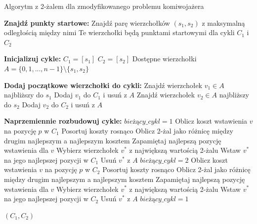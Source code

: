 \documentclass[12pt,a4paper]{article}
\begin{document}
\begin{algorithm}
\caption{Algorytm z 2-żalem dla zmodyfikowanego problemu komiwojażera}
\label{alg:regret_cycle}
\begin{algorithmic}[1]
\State \textbf{Znajdź punkty startowe:}
\State Znajdź parę wierzchołków $(s_1, s_2)$ z maksymalną odległością między nimi
\State Te wierzchołki będą punktami startowymi dla cykli $C_1$ i $C_2$

\State \textbf{Inicjalizuj cykle:}
\State $C_1 = [s_1]$
\State $C_2 = [s_2]$
\State Dostępne wierzchołki $A = \{0, 1, ..., n-1\} \setminus \{s_1, s_2\}$

\State \textbf{Dodaj początkowe wierzchołki do cykli:}
    \State Znajdź wierzchołek $v_1 \in A$ najbliższy do $s_1$
    \State Dodaj $v_1$ do $C_1$ i usuń z $A$
        \State Znajdź wierzchołek $v_2 \in A$ najbliższy do $s_2$
        \State Dodaj $v_2$ do $C_2$ i usuń z $A$
    \EndIf
\EndIf

\State \textbf{Naprzemiennie rozbudowuj cykle:}
\State $bieżący\_cykl = 1$ 
                \State Oblicz koszt wstawienia $v$ na pozycję $p$ w $C_1$
            \EndFor
            \State Posortuj koszty rosnąco
            \State Oblicz 2-żal jako różnicę między drugim najlepszym a najlepszym kosztem
            \State Zapamiętaj najlepszą pozycję wstawienia dla $v$
        \EndFor
        \State Wybierz wierzchołek $v^*$ z największą wartością 2-żalu
        \State Wstaw $v^*$ na jego najlepszej pozycji w $C_1$
        \State Usuń $v^*$ z $A$
        \State $bieżący\_cykl = 2$
    \Else
                \State Oblicz koszt wstawienia $v$ na pozycję $p$ w $C_2$
            \EndFor
            \State Posortuj koszty rosnąco
            \State Oblicz 2-żal jako różnicę między drugim najlepszym a najlepszym kosztem
            \State Zapamiętaj najlepszą pozycję wstawienia dla $v$
        \EndFor
        \State Wybierz wierzchołek $v^*$ z największą wartością 2-żalu
        \State Wstaw $v^*$ na jego najlepszej pozycji w $C_2$
        \State Usuń $v^*$ z $A$
        \State $bieżący\_cykl = 1$
    \EndIf
\EndWhile

\State \Return $(C_1, C_2)$
\end{algorithmic}
\end{algorithm}
\end{document}
